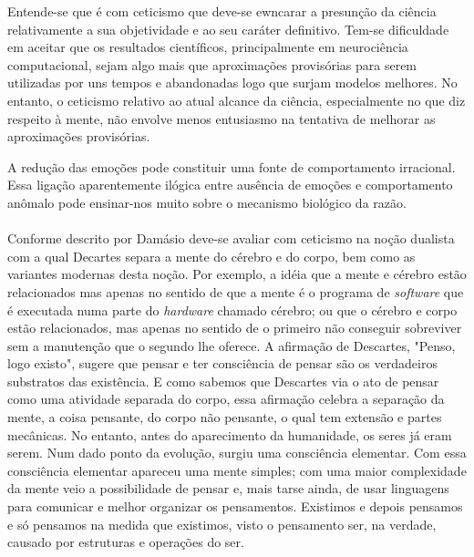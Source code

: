 Entende-se que é com ceticismo que deve-se ewncarar a presunção da ciência relativamente a sua objetividade e ao seu caráter definitivo. Tem-se dificuldade em aceitar que os resultados científicos, principalmente em neurociência computacional, sejam algo mais que aproximações provisórias para serem utilizadas por uns tempos e abandonadas logo que surjam modelos melhores. No entanto, o ceticismo relativo ao atual alcance da ciência, especialmente no que diz respeito à mente, não envolve menos entusiasmo na tentativa de melhorar as aproximações provisórias.


A redução das emoções pode constituir uma fonte de comportamento irracional. Essa ligação aparentemente ilógica entre ausência de emoções e comportamento anômalo pode ensinar-nos muito sobre o mecanismo biológico da razão.


\paragraph{}Conforme descrito por Damásio \cite{Damasio96} deve-se avaliar com ceticismo na noção dualista com a qual Decartes separa a mente do cérebro e do corpo, bem como as variantes modernas desta noção. Por exemplo, a idéia que a mente e cérebro estão relacionados mas apenas no sentido de que a mente é o programa de \textit{software} que é executada numa parte do \textit{hardware} chamado cérebro; ou que o cérebro e corpo estão relacionados, mas apenas no sentido de o primeiro não conseguir sobreviver sem a manutenção que o segundo lhe oferece. A afirmação de Descartes, "Penso, logo existo", sugere que pensar e ter consciência de pensar são os verdadeiros substratos das existência. E como sabemos que Descartes via o ato de pensar como uma atividade separada do corpo, essa afirmação celebra a separação da mente, a coisa pensante, do corpo não pensante, o qual tem extensão e partes mecânicas.
No entanto, antes do aparecimento da humanidade, os seres já eram serem. Num dado ponto da evolução, surgiu uma consciência elementar. Com essa consciência elementar apareceu uma mente simples; com uma maior complexidade da mente veio a possibilidade de pensar e, mais tarse ainda, de usar linguagens para comunicar e melhor organizar os pensamentos. Existimos e depois pensamos e só pensamos na medida que existimos, visto o pensamento ser, na verdade, causado por estruturas e operações do ser.
